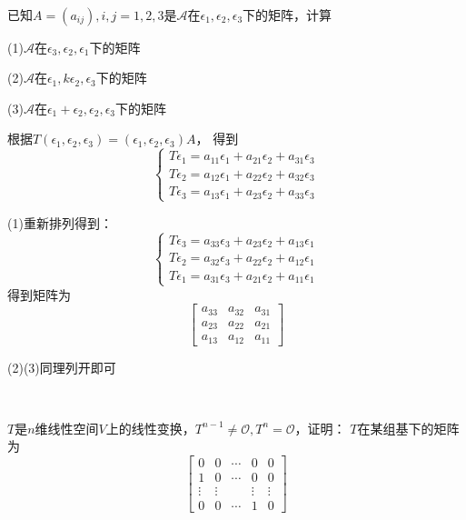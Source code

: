 ~

\begin{exercise}[线性变换在基下的矩阵]
  已知$A = (a_{ij}), i,j = 1,2,3$是$\mathcal{A}$在$\epsilon_1,\epsilon_2,\epsilon_3$下的矩阵，计算

  (1)$\mathcal{A}$在$\epsilon_3,\epsilon_2,\epsilon_1$下的矩阵
  
  (2)$\mathcal{A}$在$\epsilon_1,k\epsilon_2,\epsilon_3$下的矩阵

  (3)$\mathcal{A}$在$\epsilon_1 + \epsilon_2,\epsilon_2,\epsilon_3$下的矩阵
\end{exercise}

\begin{solution}
  根据$T(\epsilon_1,\epsilon_2,\epsilon_3 )= (\epsilon_1,\epsilon_2,\epsilon_3)A$，
  得到
  \begin{equation*}
    \begin{cases}
      T \epsilon_1 = a_{11}\epsilon_1 + a_{21}\epsilon_2 + a_{31}\epsilon_3\\
      T \epsilon_2 = a_{12}\epsilon_1 + a_{22}\epsilon_2 + a_{32}\epsilon_3\\
      T \epsilon_3 = a_{13}\epsilon_1 + a_{23}\epsilon_2 + a_{33}\epsilon_3
    \end{cases}
  \end{equation*}
  
  (1)重新排列得到：
  \begin{equation*}
    \begin{cases}
      T \epsilon_3 = a_{33}\epsilon_3 + a_{23}\epsilon_2 + a_{13}\epsilon_1\\
      T \epsilon_2 = a_{32}\epsilon_3 + a_{22}\epsilon_2 + a_{12}\epsilon_1\\
      T \epsilon_1 = a_{31}\epsilon_3 + a_{21}\epsilon_2 + a_{11}\epsilon_1
    \end{cases}
  \end{equation*}
  得到矩阵为
  \begin{equation*}
    \left[
      \begin{array}{ccc}
        a_{33}&a_{32}&a_{31}\\
        a_{23}&a_{22}&a_{21}\\
        a_{13}&a_{12}&a_{11}
      \end{array}
    \right]
  \end{equation*}

  (2)(3)同理列开即可
\end{solution}

~

\begin{exercise}[幂零变换的矩阵]
  $T$是$n$维线性空间$V$上的线性变换，$T^{n-1} \neq \mathcal{O}, T^n = \mathcal{O}$，证明：
  $T$在某组基下的矩阵为
  \begin{equation*}
    \left[
      \begin{array}{ccccc}
        0&0&\cdots&0&0 \\
         1&0&\cdots&0&0 \\
         \vdots&\vdots&&\vdots&\vdots \\
         0&0&\cdots&1&0
      \end{array}
    \right]
  \end{equation*}
\end{exercise}

